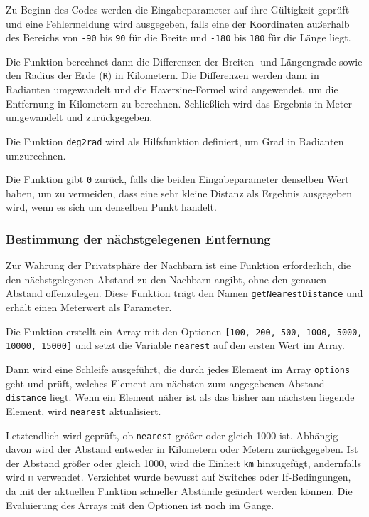 Zu Beginn des Codes werden die Eingabeparameter auf ihre Gültigkeit geprüft und eine Fehlermeldung wird ausgegeben, falls eine der Koordinaten außerhalb des Bereichs von \texttt{-90} bis \texttt{90} für die Breite und \texttt{-180} bis \texttt{180} für die Länge liegt.

Die Funktion berechnet dann die Differenzen der Breiten- und Längengrade sowie den Radius der Erde (\texttt{R}) in Kilometern. Die Differenzen werden dann in Radianten umgewandelt und die Haversine-Formel wird angewendet, um die Entfernung in Kilometern zu berechnen. Schließlich wird das Ergebnis in Meter umgewandelt und zurückgegeben.

Die Funktion \texttt{deg2rad} wird als Hilfsfunktion definiert, um Grad in Radianten umzurechnen.

Die Funktion gibt \texttt{0} zurück, falls die beiden Eingabeparameter denselben Wert haben, um zu vermeiden, dass eine sehr kleine Distanz als Ergebnis ausgegeben wird, wenn es sich um denselben Punkt handelt.


\subsubsection{Bestimmung der nächstgelegenen Entfernung}
Zur Wahrung der Privatsphäre der Nachbarn ist eine Funktion erforderlich, die den nächstgelegenen Abstand zu den Nachbarn angibt, ohne den genauen Abstand offenzulegen. Diese Funktion trägt den Namen \texttt{getNearestDistance} und erhält einen Meterwert als Parameter.

Die Funktion erstellt ein Array mit den Optionen \texttt{[100, 200, 500, 1000, 5000, 10000, 15000]} und setzt die Variable \texttt{nearest} auf den ersten Wert im Array.

Dann wird eine Schleife ausgeführt, die durch jedes Element im Array \texttt{options} geht und prüft, welches Element am nächsten zum angegebenen Abstand \texttt{distance} liegt. Wenn ein Element näher ist als das bisher am nächsten liegende Element, wird \texttt{nearest} aktualisiert.

Letztendlich wird geprüft, ob \texttt{nearest} größer oder gleich 1000 ist. Abhängig davon wird der Abstand entweder in Kilometern oder Metern zurückgegeben. Ist der Abstand größer oder gleich 1000, wird die Einheit \texttt{km} hinzugefügt, andernfalls wird \texttt{m} verwendet. Verzichtet wurde bewusst auf Switches oder If-Bedingungen, da mit der aktuellen Funktion schneller Abstände geändert werden können. Die Evaluierung des Arrays mit den Optionen ist noch im Gange.


